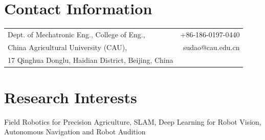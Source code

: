 \documentclass[margin,line]{res}
\begin{document}

\begin{resume}




\section{\sc Contact Information}
\vspace{.05in}
\begin{tabularx}{\textwidth}{X r}
Dept. of Mechatronic Eng., College of Eng.,      &  +86-186-0197-0440 \\            
China Agricultural University (CAU),   & sudao@cau.edu.cn\\
17 Qinghua Donglu, Haidian District, Beijing, China   & \\%
\end{tabularx}



\section{\sc Research Interests}
Field Robotics for Precision Agriculture, SLAM, Deep Learning for Robot Vision, Autonomous Navigation and Robot Audition



\end{resume}
\end{document}
